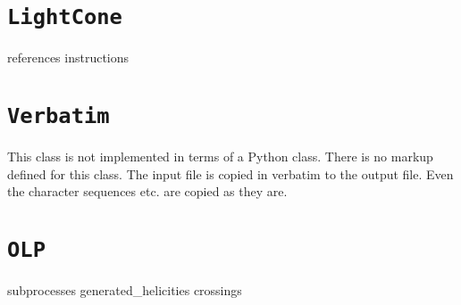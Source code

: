 \documentclass[11pt,a4paper]{refrep}
\begin{document}
\section{\texttt{LightCone}}
references
instructions

\section{\texttt{Verbatim}}
This class is not implemented in terms of a Python class. There is
no markup defined for this class. The input file is copied in
verbatim to the output file. Even the character sequences
\lit{[\%} etc. are copied as they are.

\section{\texttt{OLP}}
subprocesses
generated\_helicities
crossings
\end{document}
